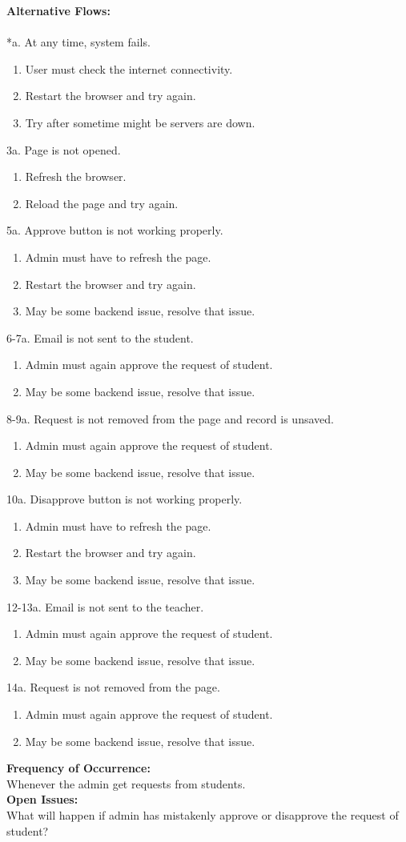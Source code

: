 \textbf{Alternative Flows:}\\
\\
*a. At any time, system fails.
\begin{enumerate}
\item User must check the internet connectivity.
\item Restart the browser and try again.
\item Try after sometime might be servers are down.
\end{enumerate}
3a. Page is not opened.
\begin{enumerate}
\item Refresh the browser.
\item Reload the page and try again.
\end{enumerate}
5a. Approve button is not working properly.
\begin{enumerate}
\item Admin must have to refresh the page.
\item Restart the browser and try again.
\item May be some backend issue, resolve that issue.
\end{enumerate}
6-7a. Email is not sent to the student.
\begin{enumerate}
\item Admin must again approve the request of student.
\item May be some backend issue, resolve that issue.
\end{enumerate}
8-9a. Request is not removed from the page and record is unsaved.
\begin{enumerate}
\item Admin must again approve the request of student.
\item May be some backend issue, resolve that issue.
\end{enumerate}
10a. Disapprove button is not working properly.
\begin{enumerate}
\item Admin must have to refresh the page.
\item Restart the browser and try again.
\item May be some backend issue, resolve that issue.
\end{enumerate}
12-13a. Email is not sent to the teacher.
\begin{enumerate}
\item Admin must again approve the request of student.
\item May be some backend issue, resolve that issue.
\end{enumerate}
14a. Request is not removed from the page.
\begin{enumerate}
\item Admin must again approve the request of student.
\item May be some backend issue, resolve that issue.
\end{enumerate}
\textbf{Frequency of Occurrence:}\\
Whenever the admin get requests from students.
\\
\textbf{Open Issues:}\\
What will happen if admin has mistakenly approve or disapprove the request of student?


